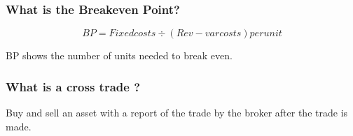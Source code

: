 \documentclass[11pt]{scrartcl} %
\begin{document}
\subsubsection{What is the Breakeven Point?}

\[ BP = Fixed costs \div (Rev - var costs) per unit \]

BP shows the number of units needed to break even.

\subsubsection{What is a cross trade ?}

Buy and sell an asset with a report of the trade by the broker after the trade is made. \\






\end{document}
